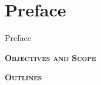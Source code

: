 
\chapter*{Preface} 

%
{Preface}

\lipsum[1-2]

\begin{adjustwidth}{-1mm}{1cm} %
{\vspace{4mm} \noindent \color{sophia} \small \bfseries {} \selectfont \scshape Objectives and Scope} \vspace{5mm}
\end{adjustwidth}

\noindent \lipsum[3-5]

\begin{adjustwidth}{-1mm}{1cm} %
{\vspace{4mm} \noindent \color{sophia} \small \bfseries {} \selectfont \scshape Outlines} \vspace{5mm}
\end{adjustwidth}

\noindent \lipsum[6-8]